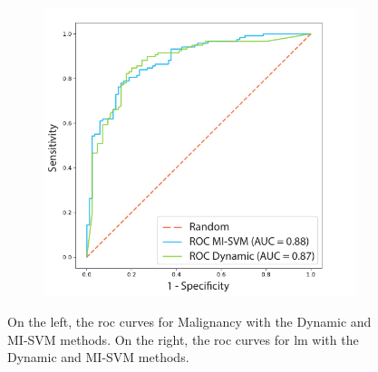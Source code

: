 \documentclass[journal,article,accept,moreauthors,pdftex, applsci]{Definitions/mdpi}
\begin{document}
\begin{figure}[H]
\begin{subfigure}{0.47\linewidth}
        \includegraphics[width=\linewidth]{Figures/Result_LMM.pdf}
    \end{subfigure} 
    \caption{On the left, the \ac{roc} curves for Malignancy with the Dynamic and MI-SVM methods. On the right, the \ac{roc} curves for \ac{lm} with the Dynamic and MI-SVM methods.}
    \label{fig:roc_results}
\end{figure}

\end{document}
